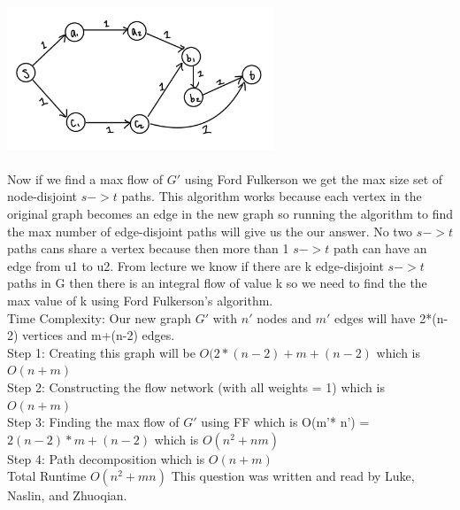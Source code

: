 \documentclass[12pt]{article}
\begin{document}
    \includegraphics[width=8cm]{Graphs/3B.jpg}
    \\\\
    Now if we find a max flow of $G'$ using Ford Fulkerson we get the max size set of node-disjoint $s->t$ paths. 
    This algorithm works because each vertex in the original graph becomes an edge in the new graph so running the algorithm to find the max number of edge-disjoint paths will give us the our answer. No two $s->t$ paths cans share a vertex because then more than 1 $s->t$ path can have an edge from u1 to u2. From lecture we know if there are k edge-disjoint $s->t$ paths in G then there is an integral flow of value k so we need to find the the max value of k using Ford Fulkerson's algorithm.
    \\
    Time Complexity: Our new graph $G'$ with $n'$ nodes and $m'$ edges will have 2*(n-2) vertices and m+(n-2) edges. \\ Step 1: Creating this graph will be $O(2*(n-2) + m+(n-2)$ which is $O(n + m)$ \\
    Step 2: Constructing the flow network (with all weights = 1) which is $O(n + m)$\\
    Step 3: Finding the max flow of $G'$ using FF which is O(m'* n') = $2(n-2) * m+(n-2)$ which is $O(n^2 + nm)$\\
    Step 4: Path decomposition which is $O(n + m)$\\
    \newline Total Runtime $O(n^2 + mn)$
    \newline This question was written and read by  Luke, Naslin, and Zhuoqian.
\end{document}
